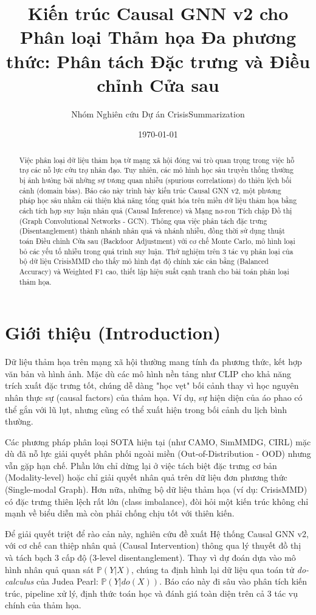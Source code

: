 \documentclass[11pt,a4paper]{article}
\title{\textbf{Kiến trúc Causal GNN v2 cho Phân loại Thảm họa Đa phương thức: Phân tách Đặc trưng và Điều chỉnh Cửa sau}}
\author{Nhóm Nghiên cứu Dự án CrisisSummarization}
\date{\today}
\begin{document}
\maketitle

\begin{abstract}
Việc phân loại dữ liệu thảm họa từ mạng xã hội đóng vai trò quan trọng trong việc hỗ trợ các nỗ lực cứu trợ nhân đạo. Tuy nhiên, các mô hình học sâu truyền thống thường bị ảnh hưởng bởi những sự tương quan nhiễu (spurious correlations) do thiên lệch bối cảnh (domain bias). Báo cáo này trình bày kiến trúc Causal GNN v2, một phương pháp học sâu nhằm cải thiện khả năng tổng quát hóa trên miền dữ liệu thảm họa bằng cách tích hợp suy luận nhân quả (Causal Inference) và Mạng nơ-ron Tích chập Đồ thị (Graph Convolutional Networks - GCN). Thông qua việc phân tách đặc trưng (Disentanglement) thành nhánh nhân quả và nhánh nhiễu, đồng thời sử dụng thuật toán Điều chỉnh Cửa sau (Backdoor Adjustment) với cơ chế Monte Carlo, mô hình loại bỏ các yếu tố nhiễu trong quá trình suy luận. Thử nghiệm trên 3 tác vụ phân loại của bộ dữ liệu CrisisMMD cho thấy mô hình đạt độ chính xác cân bằng (Balanced Accuracy) và Weighted F1 cao, thiết lập hiệu suất cạnh tranh cho bài toán phân loại thảm họa.
\end{abstract}

\section{Giới thiệu (Introduction)}

Dữ liệu thảm họa trên mạng xã hội thường mang tính đa phương thức, kết hợp văn bản và hình ảnh. Mặc dù các mô hình nền tảng như CLIP cho khả năng trích xuất đặc trưng tốt, chúng dễ dàng "học vẹt" bối cảnh thay vì học nguyên nhân thực sự (causal factors) của thảm họa. Ví dụ, sự hiện diện của áo phao có thể gắn với lũ lụt, nhưng cũng có thể xuất hiện trong bối cảnh du lịch bình thường.

Các phương pháp phân loại SOTA hiện tại (như CAMO, SimMMDG, CIRL) mặc dù đã nỗ lực giải quyết phân phối ngoài miền (Out-of-Distribution - OOD) nhưng vẫn gặp hạn chế. Phần lớn chỉ dừng lại ở việc tách biệt đặc trưng cơ bản (Modality-level) hoặc chỉ giải quyết nhân quả trên dữ liệu đơn phương thức (Single-modal Graph). Hơn nữa, những bộ dữ liệu thảm họa (ví dụ: CrisisMMD) có đặc trưng thiên lệch rất lớn (class imbalance), đòi hỏi một kiến trúc không chỉ mạnh về biểu diễn mà còn phải chống chịu tốt với thiên kiến.

Để giải quyết triệt để rào cản này, nghiên cứu đề xuất Hệ thống Causal GNN v2, với cơ chế can thiệp nhân quả (Causal Intervention) thông qua lý thuyết đồ thị và tách bạch 3 cấp độ (3-level disentanglement). Thay vì dự đoán dựa vào mô hình nhân quả quan sát $\mathbb{P}(Y|X)$, chúng ta định hình lại dữ liệu qua toán tử \textit{do-calculus} của Judea Pearl: $\mathbb{P}(Y|do(X))$. Báo cáo này đi sâu vào phân tích kiến trúc, pipeline xử lý, định thức toán học và đánh giá toàn diện trên cả 3 tác vụ chính của thảm họa.
\end{document}
